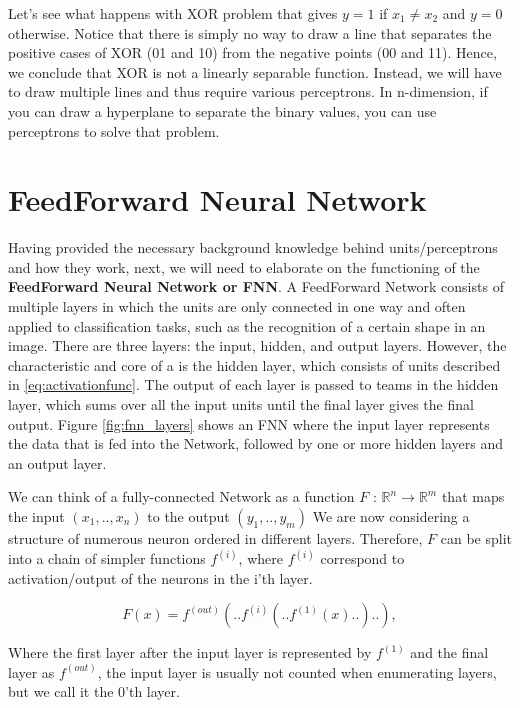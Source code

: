 Let’s see what happens with XOR problem that gives $y=1$ if $x_1\neq x_2 $ and  $y=0$ otherwise.
Notice that there is simply no way to draw a line that separates the positive cases of XOR (01 and 10) from the negative points (00 and 11). Hence, we conclude that XOR is not a linearly separable function.
Instead, we will have to draw multiple lines and thus require various perceptrons. In n-dimension, if you can draw a hyperplane to separate the binary values, you can use perceptrons to solve that problem.



\section{FeedForward Neural Network}
Having provided the necessary background knowledge behind units/perceptrons and how they work, next, we will need to elaborate on the functioning of the \textbf{FeedForward Neural Network or FNN}. A FeedForward Network consists of multiple layers in which the units are only connected in one way and
often applied to classification tasks, such as the recognition of a certain
shape in an image. There are three layers: the input, hidden, and output layers.  However, the characteristic and core of a  is the hidden layer, which consists of units described in \ref{eq:activationfunc}. The output of each layer is passed to teams in the hidden layer, which sums over all the input units until the final layer gives the final output. Figure \ref{fig:fnn_layers} shows an FNN where the input layer represents the data that is fed into the Network, followed by one or more hidden layers and an output layer.

We can think of a fully-connected Network as a function $F$ : $\mathbb{R}^n \to \mathbb{R}^m$ that maps the input $(x_1, .., x_n)$ to the output $(y_1, .., y_m)$ We
are now considering a structure of numerous neuron ordered in different layers. Therefore, $F$ can be split into a chain of simpler functions $f^{(i)}$, where  $f^{(i)}$ correspond to activation/output of the neurons in the i'th layer.

\begin{equation}
    F(x) = f^{(out)}(..f^{(i)}(..f^{(1)}(x)..)..),
\end{equation}

Where the first layer after the input layer is represented by $f^{(1)}$ and the final layer as $f^{(out)}$, the input layer is usually not counted when enumerating layers, but we call it the 0'th layer.

